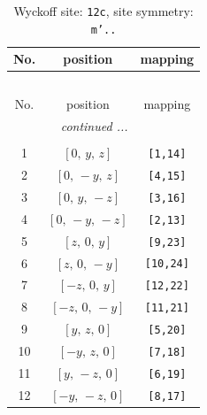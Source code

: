 \documentclass[fleqn,8pt]{jsarticle}
\begin{document}
\begin{longtable}{ccc}
\caption{Wyckoff site: {\tt 12c}, site symmetry: {\tt m'..}}
 \\
 \hline \hline
No. & position & mapping \\ \hline \endfirsthead

\multicolumn{2}{l}{\tablename\ \thetable{}} \\
 \hline \hline
No. & position & mapping \\ \hline \endhead

 \hline \hline
\multicolumn{2}{r}{\footnotesize\it continued ...} \\ \endfoot

 \hline \hline
\multicolumn{2}{r}{} \\ \endlastfoot

1 & $\left[ 0,\, y,\, z \right]$ & {\tt [1,14]} \\ \hline
2 & $\left[ 0,\, - y,\, z \right]$ & {\tt [4,15]} \\ \hline
3 & $\left[ 0,\, y,\, - z \right]$ & {\tt [3,16]} \\ \hline
4 & $\left[ 0,\, - y,\, - z \right]$ & {\tt [2,13]} \\ \hline
5 & $\left[ z,\, 0,\, y \right]$ & {\tt [9,23]} \\ \hline
6 & $\left[ z,\, 0,\, - y \right]$ & {\tt [10,24]} \\ \hline
7 & $\left[ - z,\, 0,\, y \right]$ & {\tt [12,22]} \\ \hline
8 & $\left[ - z,\, 0,\, - y \right]$ & {\tt [11,21]} \\ \hline
9 & $\left[ y,\, z,\, 0 \right]$ & {\tt [5,20]} \\ \hline
10 & $\left[ - y,\, z,\, 0 \right]$ & {\tt [7,18]} \\ \hline
11 & $\left[ y,\, - z,\, 0 \right]$ & {\tt [6,19]} \\ \hline
12 & $\left[ - y,\, - z,\, 0 \right]$ & {\tt [8,17]} \\
\end{longtable}
\renewcommand{\arraystretch}{1.2}
\end{document}
